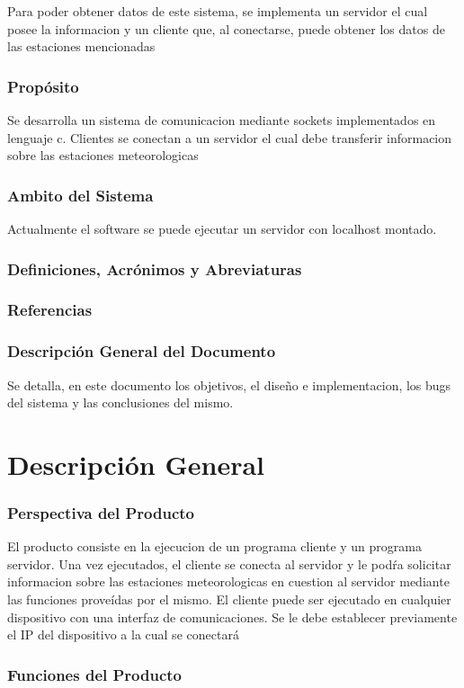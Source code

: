 \documentclass[10pt, a4paper,notitlepage]{article}
\begin{document}
Para poder obtener datos de este sistema, se implementa un servidor el cual posee la informacion y un cliente que, al conectarse, puede obtener los datos de las estaciones mencionadas
\subsubsection{Propósito}
Se desarrolla un sistema de comunicacion mediante sockets implementados en lenguaje c. Clientes se conectan a un servidor el cual debe transferir informacion sobre las estaciones meteorologicas
\subsubsection{Ambito del Sistema}
Actualmente el software se puede ejecutar un servidor con localhost montado.
\subsubsection{Definiciones, Acrónimos y Abreviaturas} 
\subsubsection{Referencias}

\subsubsection{Descripción General del Documento}
Se detalla, en este documento los objetivos, el diseño e implementacion, los bugs del sistema y las conclusiones del mismo.
\section{Descripción General}
\subsubsection{Perspectiva del Producto }
El producto consiste en la ejecucion de un programa cliente y un programa servidor.
Una vez ejecutados, el cliente se conecta al servidor y le podŕa solicitar informacion sobre las estaciones meteorologicas en cuestion al servidor mediante las funciones proveídas por el mismo.
El cliente puede ser ejecutado en cualquier dispositivo con una interfaz de comunicaciones. Se le debe establecer previamente el IP del dispositivo a la cual se conectará
\subsubsection{Funciones del Producto}
\end{document}
